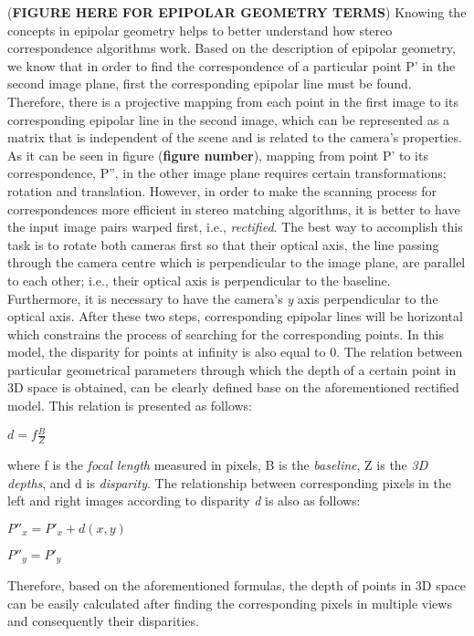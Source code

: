 \documentclass[dvips,letterpaper,12pt]{report}
\begin{document}
(\textbf{FIGURE HERE FOR EPIPOLAR GEOMETRY TERMS}) 
\newline 
Knowing the concepts in epipolar geometry helps to better understand how stereo correspondence algorithms work. Based on the description of epipolar geometry, 
we know that in order to find the correspondence of a particular point P' in the second image plane, first the corresponding epipolar line must be found. 
Therefore, there is a projective mapping from each point in the first image 
to its corresponding epipolar line in the second image, which can be represented as a matrix that is independent of the scene and is related to the camera's properties.\cite{hart2000} As it can be
seen in figure (\textbf{figure number}), mapping from point P' to its correspondence, P'', in the other image plane requires certain transformations; rotation and translation. However, in order
to make the scanning process for correspondences more efficient in stereo matching algorithms, 
it is better to have the input image pairs warped first, i.e., {\it rectified}. The best way to accomplish this task is to
rotate both cameras first so that their optical axis, the line passing through the camera centre which is perpendicular to the image plane, are parallel to each other; 
i.e., their optical axis is perpendicular to the baseline. Furthermore, it is necessary to have the camera's {\it y} axis perpendicular to the optical axis. After these two steps,
corresponding epipolar lines will be horizontal which constrains the process of searching for the corresponding points. 
In this model, the disparity for points at infinity is also equal to 0.\cite{sze11}
The relation between particular geometrical parameters through which the depth of a certain point in 3D space is obtained, can be clearly defined base on the aforementioned rectified model. 
This relation is presented as follows:
\begin{center}
$d = f\frac{B}{Z}$
\end{center}
where f is the {\it focal length} measured in pixels, B is the {\it baseline}, Z is the {\it 3D depths}, and d is {\it disparity}. The relationship between corresponding pixels in the left
and right images according to disparity {\it d} is also as follows:
\begin{center}
${P}''_{x}={P}'_{x}+d(x,y)$

${P}''_{y} = {P}'_{y}$
\end{center}
Therefore, based on the aforementioned formulas, the depth of points in 3D space can be easily calculated after finding the corresponding pixels in multiple views and consequently their
disparities. \cite{bol87,oku93,sch02}
\end{document}
